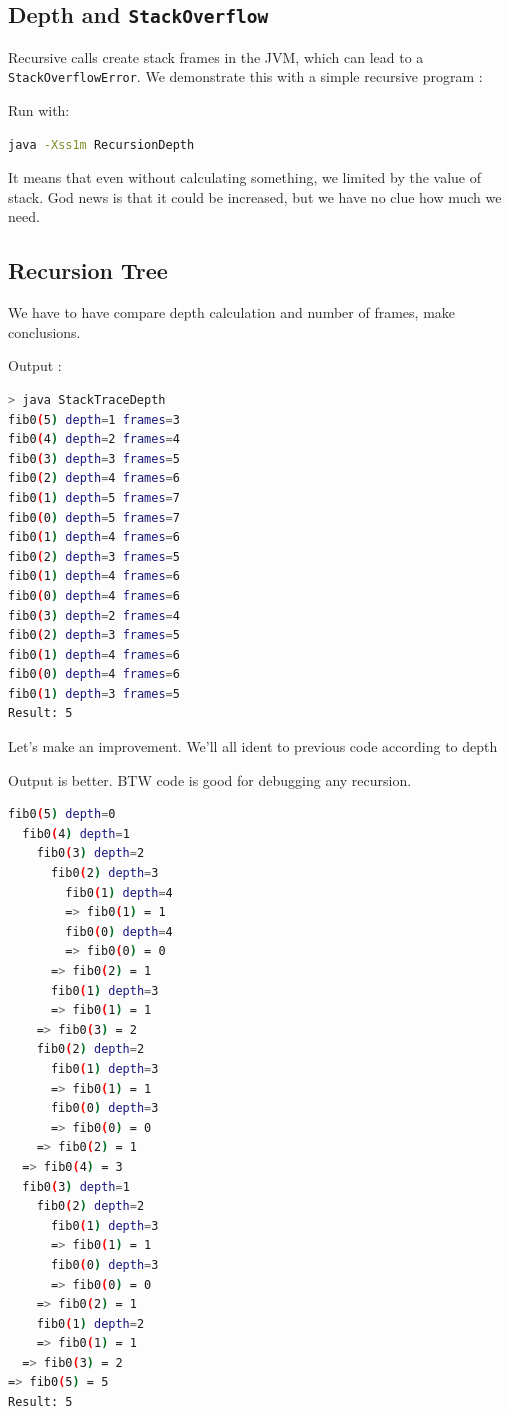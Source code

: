 \documentclass{article}
\begin{document}
\subsection{Depth and \lstinline[basicstyle=\ttfamily\small]{StackOverflow}}
Recursive calls create stack frames in the JVM, which can lead to a \texttt{StackOverflowError}. We demonstrate this with a simple recursive program :

Run with:
\begin{lstlisting}[language=bash,caption={Running RecursionDepth}]
	java -Xss1m RecursionDepth
\end{lstlisting}

It means that even without calculating something, we limited by the value of stack. God news is that it could be increased, but we have no clue how much we need.

\subsection{Recursion Tree}

We have to have compare depth calculation and number of frames, make conclusions.

Output : 
\begin{lstlisting}[language=bash]
> java StackTraceDepth
fib0(5) depth=1 frames=3
fib0(4) depth=2 frames=4
fib0(3) depth=3 frames=5
fib0(2) depth=4 frames=6
fib0(1) depth=5 frames=7
fib0(0) depth=5 frames=7
fib0(1) depth=4 frames=6
fib0(2) depth=3 frames=5
fib0(1) depth=4 frames=6
fib0(0) depth=4 frames=6
fib0(3) depth=2 frames=4
fib0(2) depth=3 frames=5
fib0(1) depth=4 frames=6
fib0(0) depth=4 frames=6
fib0(1) depth=3 frames=5
Result: 5
\end{lstlisting}

Let's make an improvement. We'll all ident to previous code according to depth

\newpage
Output is better. BTW code is good for debugging any recursion.
\begin{lstlisting}[language=bash]
fib0(5) depth=0
  fib0(4) depth=1
    fib0(3) depth=2
      fib0(2) depth=3
        fib0(1) depth=4
        => fib0(1) = 1
        fib0(0) depth=4
        => fib0(0) = 0
      => fib0(2) = 1
      fib0(1) depth=3
      => fib0(1) = 1
    => fib0(3) = 2
    fib0(2) depth=2
      fib0(1) depth=3
      => fib0(1) = 1
      fib0(0) depth=3
      => fib0(0) = 0
    => fib0(2) = 1
  => fib0(4) = 3
  fib0(3) depth=1
    fib0(2) depth=2
      fib0(1) depth=3
      => fib0(1) = 1
      fib0(0) depth=3
      => fib0(0) = 0
    => fib0(2) = 1
    fib0(1) depth=2
    => fib0(1) = 1
  => fib0(3) = 2
=> fib0(5) = 5
Result: 5
\end{lstlisting}
\end{document}
